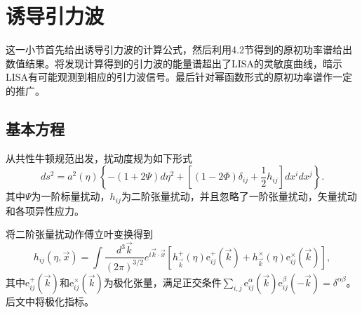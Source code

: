 \section{诱导引力波}

这一小节首先给出诱导引力波的计算公式，然后利用4.2节得到的原初功率谱给出数值结果。将发现计算得到的引力波的能量谱超出了LISA的灵敏度曲线，暗示LISA有可能观测到相应的引力波信号。最后针对幂函数形式的原初功率谱作一定的推广。

\subsection{基本方程}
从共性牛顿规范出发，扰动度规为如下形式
\begin{equation}
  \label{eq:second-order-perturbation-metric}
  ds^2=a^2(\eta) \left\{ -(1+2\Psi)d\eta^2+{\left[(1-2\Phi)\delta_{ij}+\frac{1}{2}h_{ij}\right]}dx^{i}dx^{j} \right\}.
\end{equation}
其中$\Psi$为一阶标量扰动，$h_{ij}$为二阶张量扰动，并且忽略了一阶张量扰动，矢量扰动和各项异性应力\citep{baumann2007gravitational}。

将二阶张量扰动作傅立叶变换得到
\begin{equation}
  \label{eq:second-tensor-perturbation-in-fourier-space}
  h_{ij}(\eta, \vec{x}) = \int \frac{d^3 \vec{k}}{{\left(2\pi \right)}^{3
  /2}} e^{i \vec{k}\cdot \vec{x}}
  {\left[h^{+}_{\vec{k}}(\eta)\mathrm{e}^{+}_{ij}(\vec{k})
  +h^{\times}_{\vec{k}}(\eta)\mathrm{e}^{\times}_{ij}(\vec{k})\right]},
\end{equation}
其中$\mathrm{e}^{+}_{ij}(\vec{k})$和$\mathrm{e}^{\times}_{ij}(\vec{k})$为极化张量，满足正交条件$\sum_{i,j}
\mathrm{e}^{\alpha}_{ij}(\vec{k})\mathrm{e}^{\beta}_{ij}(-\vec{k})=\delta^{\alpha\beta}$。后文中将极化指标。

